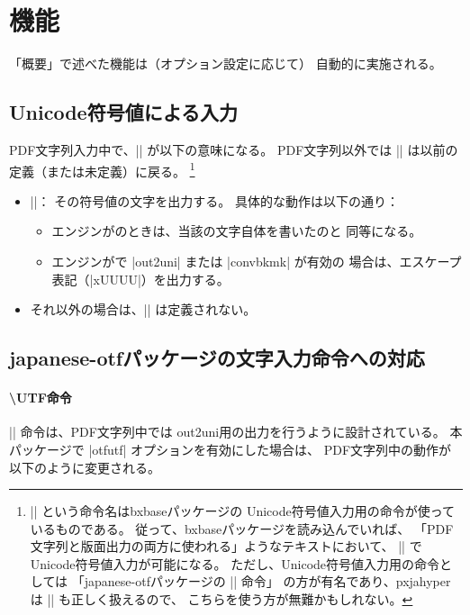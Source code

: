 \documentclass[uplatex,a4paper]{jsarticle}
\newcommand{\Pkg}[1]{\textsf{#1}}
\newcommand{\Means}{：\quad}
\begin{document}
\section{機能}

「概要」で述べた機能は（オプション設定に応じて）
自動的に実施される。

\subsection{Unicode符号値による入力}
\label{ssec:ux-command}

PDF文字列入力中で、|\Ux| が以下の意味になる。
PDF文字列以外では |\Ux| は以前の定義（または未定義）に戻る。
\footnote{|\Ux| という命令名は\Pkg{bxbase}パッケージの
Unicode符号値入力用の命令が使っているものである。
従って、\Pkg{bxbase}パッケージを読み込んでいれば、
「PDF文字列と版面出力の両方に使われる」ようなテキストにおいて、
|\Ux| でUnicode符号値入力が可能になる。
ただし、Unicode符号値入力用の命令としては
「\Pkg{japanese-otf}パッケージの |\UTF| 命令」
の方が有名であり、\Pkg{pxjahyper}は |\UTF| も正しく扱えるので、
こちらを使う方が無難かもしれない。}

\begin{itemize}
\item ||\Means
  その符号値の文字を出力する。
  具体的な動作は以下の通り：
  \begin{itemize}
  \item エンジンが{\upLaTeX}のときは、当該の文字自体を書いたのと
  同等になる。
  \item エンジンが{\pLaTeX}で |out2uni| または |convbkmk| が有効の
  場合は、エスケープ表記（|\0xUUUU|）を出力する。
  \end{itemize}
  \item それ以外の場合は、|\Ux| は定義されない。
\end{itemize}

\subsection{\Pkg{japanese-otf}パッケージの文字入力命令への対応}
\label{ssec:otf-package}

\paragraph{\textbackslash UTF命令}
|\UTF| 命令は、PDF文字列中では
out2uni用の出力を行うように設計されている。
本パッケージで |otfutf| オプションを有効にした場合は、
PDF文字列中の動作が以下のように変更される。
\end{document}
